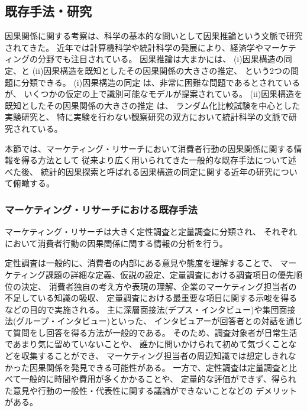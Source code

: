 
\subsection{既存手法・研究}

因果関係に関する考察は、科学の基本的な問いとして因果推論という文脈で研究されてきた。
近年では計算機科学や統計科学の発展により、経済学やマーケティングの分野でも注目されている\cite{Varian2016-se}。
因果推論は大まかには、
(i)因果構造の同定、と
(ii)因果構造を既知としたその因果関係の大きさの推定、
という2つの問題に分類できる。
(i)因果構造の同定 は、非常に困難な問題であるとされているが、
いくつかの仮定の上で識別可能なモデルが提案されている。
(ii)因果構造を既知としたその因果関係の大きさの推定 は、
ランダム化比較試験を中心とした実験研究と、
特に実験を行わない観察研究の双方において統計科学の文脈で研究されている。

本節では、マーケティング・リサーチにおいて消費者行動の因果関係に関する情報を得る方法として
従来より広く用いられてきた一般的な既存手法について述べた後、
統計的因果探索と呼ばれる因果構造の同定に関する近年の研究について俯瞰する。

\subsubsection{マーケティング・リサーチにおける既存手法}

マーケティング・リサーチは大きく定性調査と定量調査に分類され、
それぞれにおいて消費者行動の因果関係に関する情報の分析を行う。

定性調査は一般的に、消費者の内部にある意見や態度を理解することで、
マーケティング課題の詳細な定義、仮説の設定、定量調査における調査項目の優先順位の決定、
消費者独自の考え方や表現の理解、企業のマーケティング担当者の不足している知識の吸収、
定量調査における最重要な項目に関する示唆を得るなどの目的で実施される\cite{2018-ci}。
主に深層面接法(デプス・インタビュー)や集団面接法(グループ・インタビュー)といった、
インタビュアーが回答者との対話を通じて質問をし回答を得る方法が一般的である。
そのため、調査対象者が日常生活であまり気に留めていないことや、
誰かに問いかけられて初めて気づくことなどを収集することができ\cite{2018-ci}、
マーケティング担当者の周辺知識では想定しきれなかった因果関係を発見できる可能性がある。
一方で、定性調査は定量調査と比べて一般的に時間や費用が多くかかることや、
定量的な評価ができず、得られた意見や行動の一般性・代表性に関する議論ができないことなどの
デメリットがある。

